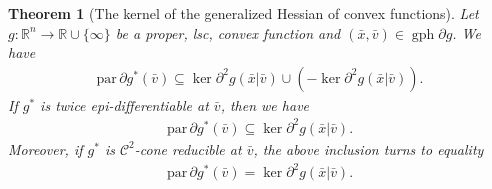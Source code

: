 \documentclass[reqno]{amsart}
\newtheorem{theorem}[proposition]{Theorem}
\numberwithin{equation}{section}
\newcommand{\R}{\mathbb{R}}
\newcommand{\para}{\mathrm{par}\,}
\begin{document}
\begin{theorem}[The kernel of the generalized Hessian of convex functions]\label{thm:c2conepargenhess}
    Let $g:\R^n\to \R\cup\{\infty\}$ be a proper, lsc, convex function and $(\bar{x}, \bar{v}) \in \operatorname{gph} \partial g$.
    We have \begin{align}\label{eq:pargenhess}
        \para \partial g^* (\bar{v}) \subseteq \ker \partial^2 g(\bar{x} | \bar{v}) \cup (- \ker \partial^2 g(\bar{x} | \bar{v})).
    \end{align}
     If $g^*$ is twice epi-differentiable at $\bar{v}$, then we have 
    \begin{align}\label{eq:pargenhesstw}
        \para \partial g^* (\bar{v}) \subseteq \ker \partial^2 g(\bar{x} | \bar{v}).
    \end{align}
    Moreover, if $g^*$ is $\mathcal{C}^2$-cone reducible at $\bar{v}$, the above inclusion turns to equality
    \begin{align}\label{eq:pargenhessc2}
        \para \partial g^* (\bar{v}) = \ker \partial^2 g(\bar{x} | \bar{v}).
    \end{align} 
\end{theorem}
\end{document}
